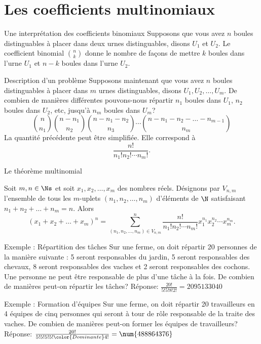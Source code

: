 \documentclass[nuit,charter,pied]{BeamerJS}
\begin{document}
\section{Les coefficients multinomiaux}
\begin{frame}[t]{Une interprétation des coefficients binomiaux}
	Supposons que vous avez $n$ boules distinguables à placer dans deux urnes distinguables, disons $U_1$ et $U_2$. Le coefficient binomial $\binom{n}{k}$ donne le nombre de façons de mettre $k$ boules dans l'urne $U_1$ et $n-k$ boules dans l'urne $U_2$.
\end{frame}
\begin{frame}{Description d'un problème}
	Supposons maintenant que vous avez $n$ boules distinguables à placer dans $m$ urnes distinguables, disons $U_1, U_2, \ldots, U_m$. De combien de manières différentes pouvons-nous répartir $n_1$ boules dans $U_1$, $n_2$ boules dans $U_2$, etc, jusqu'à $n_m$ boules dans $U_m$? \pause
	\[\binom{n}{n_1}\binom{n-n_1}{n_2}\binom{n-n_1-n_2}{n_3} \cdots \binom{n-n_1-n_2-\ldots-n_{m-1}}{n_m}\]
	\pause
	La quantité précédente peut être simplifiée. Elle correspond à
	\[\frac{n!}{n_1!n_2!\cdots n_m!}.\]
\end{frame}
\begin{frame}{Le théorème multinomial}
\pause
	\begin{thm}{}
		Soit $m,n\in\Ns$ et soit \(x_1,x_2,\ldots,x_m\) des nombres réels. Désignons par $V_{n,m}$ l'ensemble de tous les $m$-uplets $(n_1,n_2,\ldots,n_m)$ d'éléments de $\N$ satisfaisant $n_1+n_2+\ldots+n_m=n$. Alors 
		\[(x_1+x_2+\ldots+x_m)^{n}=\sum _{(n_1,n_2,\ldots,n_m)\in V_{n,m}}^{n}\frac{n!}{n_1!n_2!\cdots n_m!}x_1^{n_1}x_2^{n_2}\cdots x_m^{n_m}.\]
	\end{thm}
\end{frame}

\begin{frame}{Exemple : Répartition des tâches}
	Sur une ferme, on doit répartir 20 personnes de la manière suivante : 5 seront responsables du jardin, 5 seront responsables des chevaux, 8 seront responsables des vaches et 2 seront responsables des cochons. Une personne ne peut être responsable de plus d'une tâche à la fois. De combien de manières peut-on répartir les tâches?
	\vfill 
	\pause
	{\color{black!60}Réponse: \(\frac{20!}{5!5!8!2!}=\num{2095133040}\)}
\end{frame}

\begin{frame}{Exemple : Formation d'équipes}
	Sur une ferme, on doit répartir 20 travailleurs en 4 équipes de cinq personnes qui seront à tour de rôle responsable de la traite des vaches. De combien de manières peut-on former les équipes de travailleurs?
	\vfill 
	\pause
	{\color{black!60}Réponse: \(\frac{20!}{5!5!5!5!{\color{Dominante}4!}}=\num{488864376}\)}
\end{frame}
\end{document}
